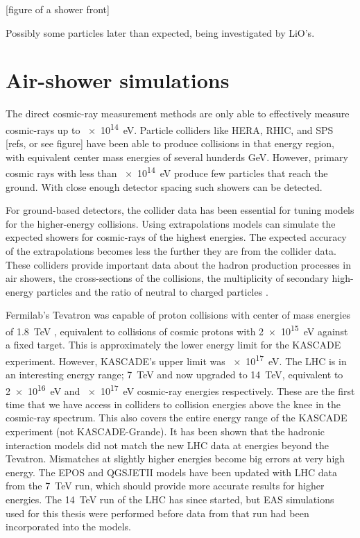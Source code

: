 [figure of a shower front]

Possibly some particles later than expected, being investigated by LiO's.


\section{Air-shower simulations}

The direct cosmic-ray measurement methods are only able to effectively measure cosmic-rays up to \SI{e14}{\eV}. Particle colliders like HERA, RHIC, and SPS [refs, or see figure] have been able to produce collisions in that energy region, with equivalent center mass energies of several hunderds \si{\GeV}. However, primary cosmic rays with less than \SI{e14}{\eV} produce few particles that reach the ground. With close enough detector spacing such showers can be detected.

For ground-based detectors, the collider data has been essential for tuning models for the higher-energy collisions. Using extrapolations models can simulate the expected showers for cosmic-rays of the highest energies. The expected accuracy of the extrapolations becomes less the further they are from the collider data. These colliders provide important data about the hadron production processes in air showers, the cross-sections of the collisions, the multiplicity of secondary high-energy particles and the ratio of neutral to charged particles \cite{pierog2008lhc}.

Fermilab's Tevatron was capable of proton collisions with center of mass energies of \SI{1.8}{\TeV} \cite{abe1994tevatron}, equivalent to collisions of cosmic protons with \SI{2e15}{\eV} against a fixed target. This is approximately the lower energy limit for the KASCADE experiment. However, KASCADE's upper limit was \SI{e17}{\eV}. The LHC is in an interesting energy range; \SI{7}{\TeV} and now upgraded to \SI{14}{\TeV}, equivalent to \SI{2e16}{\eV} and \SI{e17}{\eV} cosmic-ray energies respectively. These are the first time that we have access in colliders to collision energies above the knee in the cosmic-ray spectrum. This also covers the entire energy range of the KASCADE experiment (not KASCADE-Grande). It has been shown that the hadronic interaction models did not match the new LHC data at energies beyond the Tevatron. Mismatches at slightly higher energies become big errors at very high energy. The EPOS and QGSJETII models have been updated with LHC data from the \SI{7}{\TeV} run, which should provide more accurate results for higher energies. The \SI{14}{\TeV} run of the LHC has since started, but EAS simulations used for this thesis were performed before data from that run had been incorporated into the models.

